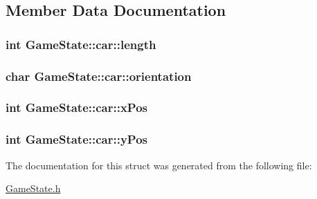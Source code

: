 \subsection{\-Member \-Data \-Documentation}
\hypertarget{struct_game_state_1_1car_a8a99c3e1010b5f8e8fca461a1e5c567f}{
\subsubsection[{length}]{\setlength{\rightskip}{0pt plus 5cm}int {\bf \-Game\-State\-::car\-::length}}}\label{struct_game_state_1_1car_a8a99c3e1010b5f8e8fca461a1e5c567f}
\hypertarget{struct_game_state_1_1car_ac0effead63018546a522b068b5d01cfc}{
\subsubsection[{orientation}]{\setlength{\rightskip}{0pt plus 5cm}char {\bf \-Game\-State\-::car\-::orientation}}}\label{struct_game_state_1_1car_ac0effead63018546a522b068b5d01cfc}
\hypertarget{struct_game_state_1_1car_afba0a0a1c151a2aee7f34f2b7827c0af}{
\subsubsection[{x\-Pos}]{\setlength{\rightskip}{0pt plus 5cm}int {\bf \-Game\-State\-::car\-::x\-Pos}}}\label{struct_game_state_1_1car_afba0a0a1c151a2aee7f34f2b7827c0af}
\hypertarget{struct_game_state_1_1car_a789d8e3d1ea009cf7450adfc10df4b41}{
\subsubsection[{y\-Pos}]{\setlength{\rightskip}{0pt plus 5cm}int {\bf \-Game\-State\-::car\-::y\-Pos}}}\label{struct_game_state_1_1car_a789d8e3d1ea009cf7450adfc10df4b41}


\-The documentation for this struct was generated from the following file\-:\begin{DoxyCompactItemize}
\item 
\hyperlink{_game_state_8h}{\-Game\-State.\-h}\end{DoxyCompactItemize}
